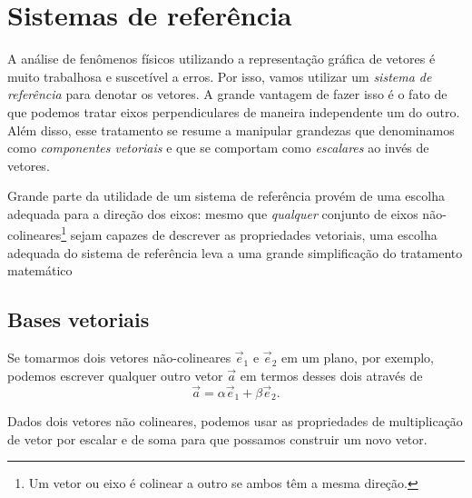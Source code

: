 \section{Sistemas de referência} 

A análise de fenômenos físicos utilizando a representação gráfica de vetores é muito trabalhosa e suscetível a erros. Por isso, vamos utilizar um \emph{sistema de referência} para denotar os vetores. A grande vantagem de fazer isso é o fato de que podemos tratar eixos perpendiculares de maneira independente um do outro. Além disso, esse tratamento se resume a manipular grandezas que denominamos como \emph{componentes vetoriais} e que se comportam como \emph{escalares} ao invés de vetores.

Grande parte da utilidade de um sistema de referência provém de uma escolha adequada para a direção dos eixos: mesmo que \emph{qualquer} conjunto de eixos não-colineares\footnote{Um vetor ou eixo é colinear a outro se ambos têm a mesma direção.} sejam capazes de descrever as propriedades vetoriais, uma escolha adequada do sistema de referência leva a uma grande simplificação do tratamento matemático

\subsection{Bases vetoriais}

Se tomarmos dois vetores não-colineares $\vec{e}_1$ e $\vec{e}_2$ em um plano, por exemplo, podemos escrever qualquer outro vetor $\vec{a}$ em termos desses dois através de
\begin{equation}
  \vec{a} = \alpha \vec{e}_1 + \beta \vec{e}_2.
\end{equation}

\begin{marginfigure}
\centering
{}
\caption{Dados dois vetores não colineares, podemos usar as propriedades de multiplicação de vetor por escalar e de soma para que possamos construir um novo vetor.\label{Fig:VetorObtidoAPartirDeUmaBase}}
\end{marginfigure}

